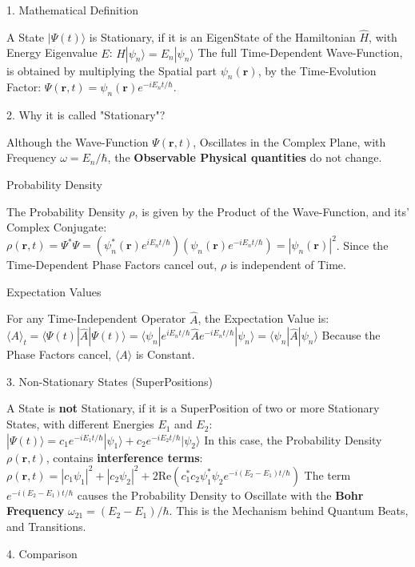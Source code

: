\documentclass[a4paper, 10pt, onepage]{elegantbook}
\begin{document}
{    1. Mathematical Definition  

A State $|\Psi(t)\rangle$ is Stationary, if it is an EigenState of the Hamiltonian $\hat{H}$, with Energy Eigenvalue 
$E$: 
$ \hat{H} |\psi_n\rangle = E_n |\psi_n\rangle $
The full Time-Dependent Wave-Function, is obtained by multiplying the Spatial part $\psi_n(\mathbf{r})$, by the 
Time-Evolution Factor: 
$\Psi(\mathbf{r}, t) = \psi_n(\mathbf{r}) e^{-i E_n t / \hbar}$.  


    2. Why it is called "Stationary"?  

Although the Wave-Function $\Psi(\mathbf{r}, t)$, Oscillates in the Complex Plane, with Frequency $\omega = E_n/\hbar$, 
the \textbf{Observable Physical quantities} do not change.  

     Probability Density  

The Probability Density $\rho$, is given by the Product of the Wave-Function, and its' Complex Conjugate:  
$\rho(\mathbf{r}, t) = \Psi^* \Psi = \left( \psi_n^*(\mathbf{r}) e^{i E_n t / \hbar} \right) \left( \psi_n(\mathbf{r}) 
e^{-i E_n t / \hbar} \right) = |\psi_n(\mathbf{r})|^2$.  
Since the Time-Dependent Phase Factors cancel out, $\rho$ is independent of Time.  

    Expectation Values  

For any Time-Independent Operator $\hat{A}$, the Expectation Value is:  
$\langle A \rangle_t = \langle \Psi(t) | \hat{A} | \Psi(t) \rangle = \langle \psi_n | e^{i E_n t / \hbar} \hat{A} e^{-i 
E_n t / \hbar} | \psi_n \rangle = \langle \psi_n | \hat{A} | \psi_n \rangle$  
Because the Phase Factors cancel, $\langle A \rangle$ is Constant.  

    3. Non-Stationary States (SuperPositions)  

A State is \textbf{not} Stationary, if it is a SuperPosition of two or more Stationary States, with different Energies 
$E_1$ and $E_2$:  
$ |\Psi(t)\rangle = c_1 e^{-i E_1 t / \hbar} |\psi_1\rangle + c_2 e^{-i E_2 t / \hbar} |\psi_2\rangle$
In this case, the Probability Density $\rho(\mathbf{r}, t)$, contains \textbf{interference terms}:  
$\rho(\mathbf{r}, t) = |c_1 \psi_1|^2 + |c_2 \psi_2|^2 + 2 \text{Re} \left( c_1^* c_2 \psi_1^* \psi_2 e^{-i(E_2 - 
E_1)t/\hbar} \right)$
The term $e^{-i(E_2 - E_1)t/\hbar}$ causes the Probability Density to Oscillate with the \textbf{Bohr Frequency} 
$\omega_{21} = (E_2 - E_1)/\hbar$. This is the Mechanism behind Quantum Beats, and Transitions.  

    4. Comparison  

}
\end{document}
